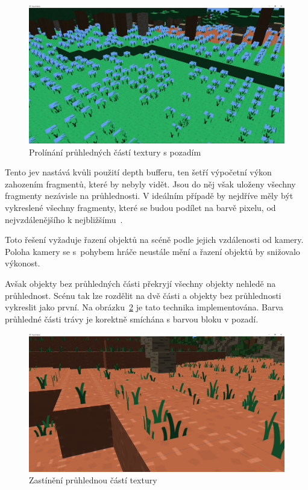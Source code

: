 \documentclass[thesis=M,czech]{FITthesis}[2019/12/23]
\begin{document}
\begin{figure}\centering
	\includegraphics[width=\textwidth]{images/alpha}
	\caption[Prolínání průhledných částí textury s pozadím]{Prolínání průhledných částí textury s pozadím}\label{fig:alpha}
\end{figure}

Tento jev nastává kvůli použití depth bufferu, ten šetří výpočetní výkon zahozením fragmentů, které by nebyly vidět. Jsou do něj však uloženy všechny fragmenty nezávisle na průhlednosti. V ideálním případě by nejdříve měly být vykreslené všechny fragmenty, které se budou podílet na barvě pixelu, od nejvzdálenějšího k nejbližšímu~\cite{lopgl_blend}.

Toto řešení vyžaduje řazení objektů na scéně podle jejich vzdálenosti od kamery. Poloha kamery se s~pohybem hráče neustále mění a řazení objektů by snižovalo výkonost.

Avšak objekty bez průhledných části překryjí všechny objekty nehledě na průhlednost. Scénu tak lze rozdělit na dvě části a objekty bez průhlednosti vykreslit jako první. Na obrázku~\ref{fig:alpha_cut_off} je tato technika implementována. Barva průhledné části trávy je korektně smíchána s barvou bloku v pozadí.

\begin{figure}\centering
	\includegraphics[width=\textwidth]{images/alpha_cut_off}
	\caption[Zastínění průhlednou částí textury]{Zastínění průhlednou částí textury}\label{fig:alpha_cut_off}
\end{figure}
\end{document}
